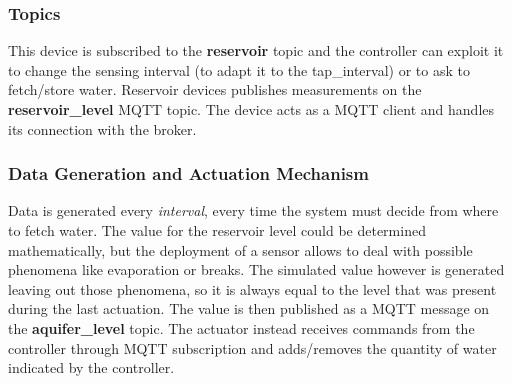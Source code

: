 \subsubsection{Topics}
This device is subscribed to the \textbf{reservoir} topic and the controller can exploit it to change the sensing interval (to adapt it to the tap\_interval) or to ask to fetch/store water. Reservoir devices publishes measurements on the \textbf{reservoir\_level} MQTT topic.
The device acts as a MQTT client and handles its connection with the broker.

\subsubsection{Data Generation and Actuation Mechanism}
Data is generated every \textit{interval}, every time the system must decide from where to fetch water. The value for the reservoir level could be determined mathematically, but the deployment of a sensor allows to deal with possible phenomena like evaporation or breaks. The simulated value however is generated leaving out those phenomena, so it is always equal to the level that was present during the last actuation. The value is then published as a MQTT message on the \textbf{aquifer\_level} topic. The actuator instead receives commands from the controller through MQTT subscription and adds/removes the quantity of water indicated by the controller. 

